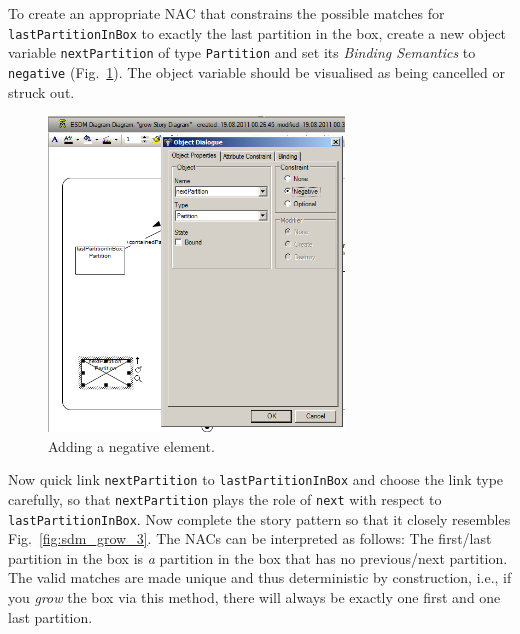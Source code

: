 To create an appropriate \mbox{NAC} that constrains the possible matches for
\texttt{lastPartitionInBox} to exactly the last partition in the box, create a
new object variable \texttt{nextPartition} of type \texttt{Partition} and set
its \emph{Binding Semantics} to \texttt{negative} (Fig.~\ref{fig:sdm_grow_2}).  
The object variable should be visualised as being cancelled or struck out.
 
\begin{figure}[htbp]
\begin{center}
  \includegraphics[width=0.7\textwidth]{pics/sdmBilder/grow/sdm58RAW}
  \caption{Adding a negative element.}  
  \label{fig:sdm_grow_2}
\end{center}
\end{figure}
 
Now quick link \texttt{nextPartition} to \texttt{lastPartitionInBox} and choose
the link type carefully, so that \texttt{nextPartition} plays the role of
\texttt{next} with respect to \texttt{lastPartitionInBox}.  Now complete the
story pattern so that it closely resembles Fig.~\ref{fig:sdm_grow_3}.  The
\mbox{NACs} can be interpreted as follows:  The first/last partition in the box
is \emph{a} partition in the box that has no previous/next partition.  The
valid matches are made unique and thus deterministic by construction, i.e., if
you \emph{grow} the box via this method, there will always be exactly one first
and one last partition.  
\clearpage

